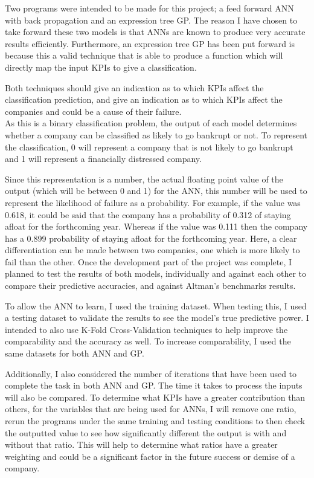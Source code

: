 \documentclass[11pt]{article}
\begin{document}
Two programs were intended to be made for this project; a feed forward ANN with back propagation and an expression tree GP.  The reason I have chosen to take forward these two models is that ANNs are known to produce very accurate results efficiently. Furthermore, an expression tree GP has been put forward is because  this a valid technique that is able to produce a function which will directly map the input KPIs to give a classification.

Both techniques should give an indication as to which KPIs affect the classification prediction, and give an indication as to which KPIs affect the companies and could be a cause of their failure.  \\
As this is a binary classification problem, the output of each model determines whether a company can be classified as likely to go bankrupt or not. To represent the classification,  0 will represent a company that is not likely to go bankrupt  and 1 will represent a financially distressed company.

Since this representation is a number, the actual floating point value of the output (which will be between 0 and 1) for the ANN, this number will be used to represent the likelihood of failure as a probability. For example, if the value was 0.618, it could be said that the company has a probability of 0.312 of staying afloat for the forthcoming year. Whereas if the value was 0.111 then the company has a 0.899 probability of staying afloat for the forthcoming year. Here, a clear differentiation can be made between two companies, one which is more likely to fail than the other.
Once the development part of the project was complete, I planned to test the results of both models, individually and against each other to compare their predictive accuracies, and against Altman's benchmarks results.

To allow the ANN to learn, I used the training dataset. When testing this, I used a testing dataset to validate the results to see the model's true predictive power. I intended to also use K-Fold Cross-Validation techniques to help improve the comparability and the accuracy as well. To increase comparability, I used the same datasets for both ANN and GP.

Additionally, I also considered the number of iterations that have been used to complete the task in both ANN and GP. The time it takes to process the inputs will also be compared. To determine what KPIs have a greater contribution than others, for the variables that are being used for ANNs, I will remove one ratio, rerun the programs under the same training and testing conditions to then check the outputted value to see how significantly different the output is with and without that ratio. This will help to determine what ratios have a greater weighting and could be a significant factor in the future success or demise of a company. 
\end{document}
